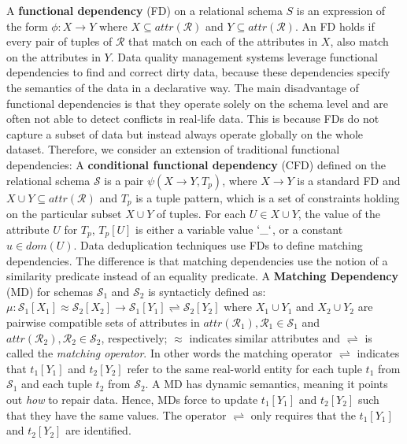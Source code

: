 A \textbf{functional dependency} (FD) on a relational schema $S$ is an expression of the form $\phi: X \rightarrow Y$ where $X \subseteq attr(\mathcal{R}) $ and $Y \subseteq attr(\mathcal{R})$. %
An FD holds if every pair of tuples of $\mathcal{R}$ that match on each of the attributes in $X$, also match on the attributes in $Y$. Data quality management systems leverage functional dependencies to find and correct dirty data, because these dependencies specify the semantics of the data in a declarative way. The main disadvantage of functional dependencies is that they operate solely on the schema level and are often not able to detect conflicts in real-life data. This is because FDs do not capture a subset of data but instead always operate globally on the whole dataset.
Therefore, we consider an extension of traditional functional dependencies:  A \textbf{conditional functional dependency} (CFD) 
defined on the relational schema $\mathcal{S}$ is a pair $\psi(X \rightarrow Y , T_p)$,  where $X \rightarrow Y$ is a standard 
FD and $X \cup Y \subseteq attr(\mathcal{R})$ and $T_p$ is a tuple pattern, which is a set of constraints holding on the particular 
subset $X \cup Y$ of tuples. For each $U \in X \cup Y$, the value of the attribute $U$ for $T_p$, $T_p[U]$ is either a variable 
value $`\_`$, or a constant $u \in dom(U)$. Data deduplication techniques use FDs to define matching dependencies. The 
difference is that matching dependencies use the notion of a similarity predicate instead of an equality predicate. A 
\textbf{Matching Dependency} (MD) for schemas $\mathcal{S}_1$ and $\mathcal{S}_2$ is syntacticly defined as:
$\mu: \mathcal{S}_1[X_1]\approx \mathcal{S}_2[X_2]\rightarrow \mathcal{S}_1[Y_1]\rightleftharpoons \mathcal{S}_2[Y_2]$ 
where $X_1 \cup Y_1$ and $X_2 \cup Y_2$ are pairwise compatible sets of attributes in $attr(\mathcal{R}_1), \mathcal{R}_1\in \mathcal{S}_1$ 
and $attr(\mathcal{R}_2), \mathcal{R}_2\in \mathcal{S}_2$, respectively; $\approx$ indicates similar attributes and $\rightleftharpoons$ 
is called the \textit{matching operator}. In other words the matching operator $\rightleftharpoons$ indicates that $t_1[Y_1]$ and $t_2[Y_2]$ refer to the same real-world entity for each tuple $t_1$ from $\mathcal{S}_1$  and each tuple $t_2$ from $\mathcal{S}_2$. A MD has dynamic semantics, meaning it points out \textit{how} to repair data. Hence, MDs force to update $t_1[Y_1]$ and $t_2[Y_2]$ such that they have the same values. %
The operator $\rightleftharpoons$ only requires that the $t_1[Y_1]$ and $t_2[Y_2]$ are identified.
